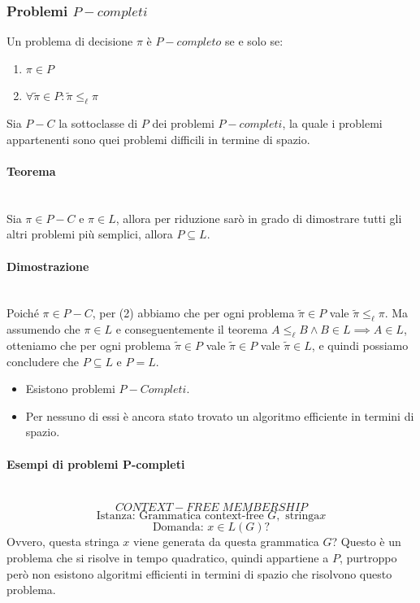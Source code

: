 \documentclass{article}
\begin{document}
\subsubsection{Problemi $P-completi$}
Un problema di decisione $\pi$ è $P-completo$ se e solo se:
\begin{enumerate}
    \item $\pi\in P$
    \item $\forall\tilde{\pi}\in P:\tilde{\pi}\leq_{\ell}\pi$
\end{enumerate}
Sia $P-C$ la sottoclasse di $P$ dei problemi $P-completi$, la quale i problemi appartenenti
sono quei problemi difficili in termine di spazio.

\paragraph{Teorema}\mbox{}\\
Sia $\pi\in P-C$ e $\pi\in L$, allora per riduzione sarò in grado di dimostrare
tutti gli altri problemi più semplici, allora $P\subseteq L$.

\paragraph{Dimostrazione}\mbox{}\\
Poiché $\pi\in P-C$, per (2) abbiamo che per ogni problema $\tilde{\pi}\in P$ vale
$\tilde{\pi}\leq_{\ell}\pi$. Ma assumendo che $\pi\in L$ e conseguentemente il teorema
$A\leq_{\ell}B\land B\in L\implies A\in L$, otteniamo che per ogni problema $\tilde{\pi}\in P$
vale $\tilde{\pi}\in P$ vale $\tilde{\pi}\in L$, e quindi possiamo concludere che $P\subseteq L$
e $P=L$.

\begin{itemize}
    \item Esistono problemi $P-Completi$.
    \item Per nessuno di essi è ancora stato trovato un algoritmo efficiente in termini
          di spazio.
\end{itemize}

\paragraph{Esempi di problemi P-completi}\mbox{}\\
$$CONTEXT-FREE\;MEMBERSHIP$$
$$\text{Istanza: Grammatica context-free }G,\text{ stringa}x$$
$$\text{Domanda: }x\in L(G)?$$
Ovvero, questa stringa $x$ viene generata da questa grammatica $G$? Questo è un problema
che si risolve in tempo quadratico, quindi appartiene a $P$, purtroppo però non esistono
algoritmi efficienti in termini di spazio che risolvono questo problema.
\end{document}
